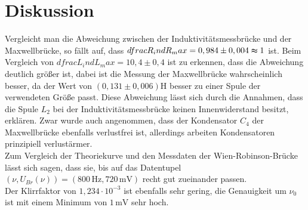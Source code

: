 \section{Diskussion}
\label{sec:Diskussion}
Vergleicht man die Abweichung zwischen der Induktivitätsmessbrücke und der Maxwellbrücke, so fällt auf, dass $dfrac{R_ind}{R_max} = 0,984 \pm 0,004 \thickapprox 1 $ ist.
Beim Vergleich von  $dfrac{L_ind}{L_max} = 10,4 \pm 0,4 $ ist zu erkennen, dass die Abweichung deutlich größer ist, dabei ist die Messung der Maxwellbrücke wahrscheinlich besser, da der Wert von $(0,131 \pm 0,006) \unit{\henry}$ besser zu einer Spule der verwendeten Größe passt.
Diese Abweichung lässt sich durch die Annahmen, dass die Spule $L_2$ bei der Induktivitätsmessbrücke keinen Innenwiderstand besitzt, erklären.
Zwar wurde auch angenommen, dass der Kondensator $C_4$ der Maxwellbrücke ebenfalls verlustfrei ist, allerdings arbeiten Kondensatoren prinzipiell verlustärmer. \\

Zum Vergleich der Theoriekurve und den Messdaten der Wien-Robinson-Brücke lässt sich sagen, dass sie, bis auf das Datentupel $(ν, U_{Br}(ν)) = (800 \,\unit{\hertz}, 720 \,\unit{\milli\volt})$ recht gut zueinander passen. \\

Der Klirrfaktor von $1,234 \cdot 10^{-3}$ ist ebenfalls sehr gering, die Genauigkeit um $ν_0$ ist mit einem Minimum von $1 \,\unit{\milli\volt}$ sehr hoch. 